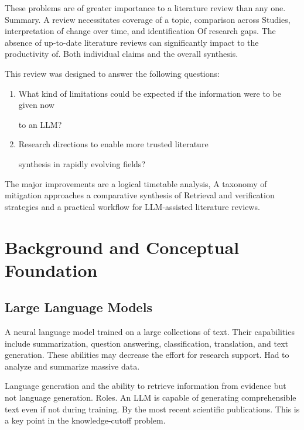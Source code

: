 \documentclass[acmsmall,screen]{acmart}
\begin{document}
These problems are of greater importance to a literature review than any one.
Summary. A review necessitates coverage of a topic, comparison across
Studies, interpretation of change over time, and identification
Of research gaps. The absence of up-to-date literature reviews can significantly impact to the productivity of.
Both individual claims and the overall synthesis.

This review was designed to answer the following questions:

\begin{enumerate}

How could information cutoff have an impact on the completeness and

interpretation of LLM-generated literature reviews?

•What retrieval and verification methods can mitigate them

effects?

\item What kind of limitations could be expected if the information were to be given now

to an LLM?

\item Research directions to enable more trusted literature

synthesis in rapidly evolving fields?

\end{enumerate}

The major improvements are a logical timetable analysis,
A taxonomy of mitigation approaches a comparative synthesis of
Retrieval and verification strategies and a practical workflow for
LLM-assisted literature reviews.

\section{Background and Conceptual Foundation}

\subsection{Large Language Models}

A neural language model trained on a large
collections of text. Their capabilities include summarization,
question answering, classification, translation, and text generation.
These abilities may decrease the effort for research support.
Had to analyze and summarize massive data.

Language generation and the ability to retrieve information from evidence but not language generation.
Roles. An LLM is capable of generating comprehensible text even if not during training.
By the most recent scientific publications. This is a key point in the
knowledge-cutoff problem.
\end{document}
